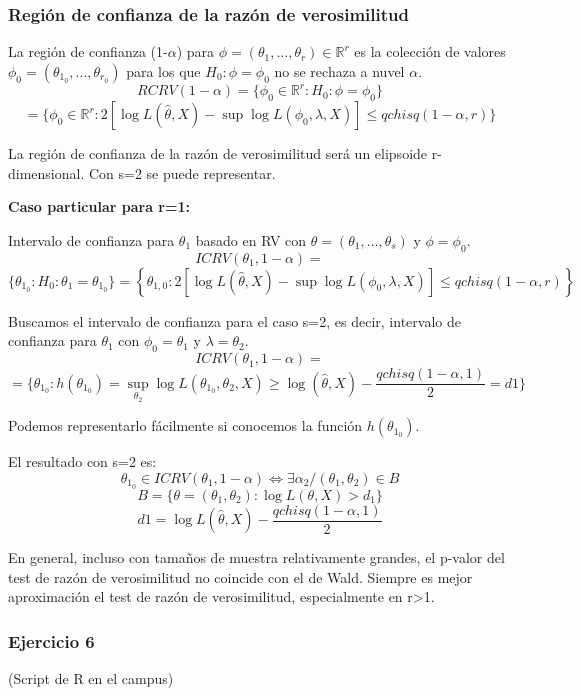 \subsubsection{Región de confianza de la razón de verosimilitud}

La región de confianza (1-$\alpha$) para $\phi=(\theta_1,\dots,\theta_r)\in \mathbb{R}^r$ es la colección de valores
$\phi_0=(\theta_{1_0},\dots,\theta_{r_0})$ para los que $H_0:\phi=\phi_0$ no se rechaza a nuvel $\alpha$.
\[
RCRV(1-\alpha)=\{\phi_0 \in \mathbb{R}^r:H_0:\phi=\phi_0\}
\]\[
    =\{\phi_0 \in \mathbb{R}^r:2[\log L(\hat{\theta},X)-\sup \log L(\phi_0,\lambda,X)] \leq qchisq(1-\alpha,r)\}
\]

La región de confianza de la razón de verosimilitud será un elipsoide r-dimensional. Con s=2 se puede representar.

\textbf{Caso particular para r=1:}

Intervalo de confianza para $\theta_1$ basado en RV con $\theta=(\theta_1,\dots,\theta_s)$ y $\phi=\phi_0$.
\[
ICRV(\theta_1,1-\alpha)=
\]\[\{\theta_{1_0}:H_0:\theta_1=\theta_{1_0}\}
= \left\{ \theta_{1,0} : 2\left[\log L(\hat{\theta},X) - \sup \log L(\phi_0, \lambda, X)\right] \leq qchisq(1 - \alpha, r) \right\}
\]

Buscamos el intervalo de confianza para el caso s=2, es decir, intervalo de confianza para $\theta_1$ con $\phi_0=\theta_1$ y $\lambda=\theta_2$.
\[
ICRV(\theta_1,1-\alpha)=
\]\[
=\{ 
\theta_{1_0}:h(\theta_{1_0})=\sup_{\theta_2} \log L(\theta_{1_0},\theta_2,X) \geq \log(\hat{\theta},X)-\frac{qchisq(1-\alpha,1)}{2}=d1
\}
\]

Podemos representarlo fácilmente si conocemos la función $h(\theta_{1_0})$.

El resultado con s=2 es:
\[
\theta_{1_0} \in  ICRV(\theta_1,1-\alpha) \Longleftrightarrow \exists \alpha_2 / (\theta_1,\theta_2) \in B
\]
\[
B=\{\theta=(\theta_1,\theta_2):\log L(\theta,X)>d_1\}
\]
\[
d1=\log L(\hat{\theta},X)-\frac{qchisq(1-\alpha,1)}{2}
\]

En general, incluso con tamaños de muestra relativamente grandes, el p-valor del test de razón de verosimilitud no coincide con el de Wald.
Siempre es mejor aproximación el test de razón de verosimilitud, especialmente en r>1.
\newpage
\subsubsection*{Ejercicio 6}
(Script de R en el campus)

